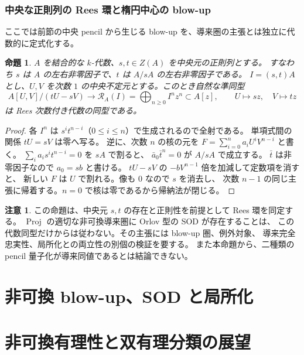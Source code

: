 \documentclass[11pt,a4paper]{ltjsarticle}
\newtheorem{proposition}[theorem]{命題}
\theoremstyle{definition}
\newtheorem{remark}[theorem]{注意}
\begin{document}
\section{中央な正則列の Rees 環と楕円中心の blow-up}
\label{sec:central-rees}
ここでは前節の中央 pencil から生じる blow-up を、導来圏の主張とは独立に代数的に定式化する。
\begin{proposition}\label{prop:rees-central-regular}
$A$ を結合的な $k$-代数、$s,t\in Z(A)$ を中央元の正則列とする。
すなわち $s$ は $A$ の左右非零因子で、$t$ は $A/sA$ の左右非零因子である。
$I=(s,t)A$ とし、$U,V$ を次数 $1$ の中央不定元とする。このとき自然な準同型
\[
 A[U,V]/(tU-sV)\longrightarrow\mathcal R_A(I)
 =\bigoplus_{n\ge0} I^n z^n\subset A[z],
 \qquad U\mapsto sz,\quad V\mapsto tz
\]
は Rees 次数付き代数の同型である。
\end{proposition}
\begin{proof}
各 $I^n$ は $s^it^{n-i}$（$0\le i\le n$）で生成されるので全射である。
単項式間の関係 $tU=sV$ は零へ写る。
逆に、次数 $n$ の核の元を $F=\sum_{i=0}^{n}a_iU^iV^{n-i}$ と書く。
$\sum_i a_is^it^{n-i}=0$ を $sA$ で割ると、
$\bar a_0\bar t^n=0$ が $A/sA$ で成立する。
$\bar t$ は非零因子なので $a_0=sb$ と書ける。
$tU-sV$ の $-bV^{n-1}$ 倍を加減して定数項を消すと、
新しい $F$ は $U$ で割れる。像も $0$ なので $s$ を消去し、
次数 $n-1$ の同じ主張に帰着する。$n=0$ で核は零であるから帰納法が閉じる。
\end{proof}
\begin{remark}
この命題は、中央元 $s,t$ の存在と正則性を前提として Rees 環を同定する。
$\operatorname{Proj}$ の適切な非可換導来圏に Orlov 型の SOD が存在することは、
この代数同型だけからは従わない。その主張には blow-up 圏、例外対象、
導来完全忠実性、局所化との両立性の別個の検証を要する。
また本命題から、二種類の pencil 量子化が導来同値であるとは結論できない。
\end{remark}



\part{非可換 blow-up、SOD と局所化}






\part{非可換有理性と双有理分類の展望}



\end{document}
